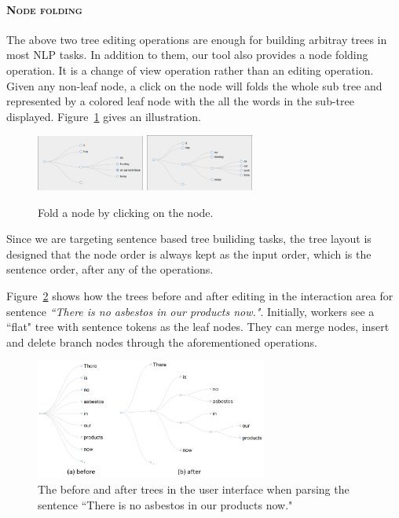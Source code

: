 \paragraph{\textsc{Node folding}\\}

The above two tree editing operations are enough for building arbitray
trees in most NLP tasks. In addition to them, our tool also provides a
node folding operation. It is a change of view operation rather than
an editing operation. Given any non-leaf node, a click on the node
will folds the whole sub tree and represented by a colored leaf node
with the all the words in the sub-tree displayed.
Figure~\ref{fig:folding.png}  gives an illustration.

\begin{figure}
\centering
\includegraphics[width=1.4in]{figs/collapse_after.png}
\includegraphics[width=1.4in]{figs/collapse_before.png}
\caption{Fold a node by clicking on the node.}
\label{fig:folding.png}
\end{figure}


Since we are targeting sentence based tree builiding tasks, the tree
layout is designed that the node order  is always kept as the input
order, which is the sentence order, after any of the operations. 

Figure~\ref{fig:interface2.png} shows how the trees before and after
editing in the interaction area for sentence {\em ``There is no
asbestos in our products now."}. Initially, workers see a ``flat" tree
with sentence tokens as the leaf nodes. They can merge nodes, insert
and delete branch nodes through the aforementioned operations. 


\begin{figure}
\centering
\includegraphics[width=3in]{figs/overview_tree_editing.png}
\caption{The before and after trees in the user interface when parsing
the sentence {``There is no asbestos in our products now."}}
\label{fig:interface2.png}
\end{figure}

